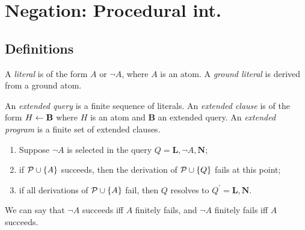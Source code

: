 \chapter{Negation: Procedural int.}

\section{Definitions}

\begin{dfn}[Literal]
    A \emph{literal} is of the form \(A\) or \(\neg A\), where \(A\) is an atom.
    A \emph{ground literal} is derived from a ground atom. 
\end{dfn}

\begin{dfn}
    An \emph{extended query} is a finite sequence of literals.
    An \emph{extended clause} is of the form \(H \leftarrow \mathbf{B}\) where \(H\) is an atom and \(\mathbf{B}\) an extended query.
    An \emph{extended program} is a finite set of extended clauses.
\end{dfn}

\begin{dfn}
    \begin{enumerate}
        \item Suppose \(\neg A\) is selected in the query \(Q = \mathbf{L}, \neg A, \mathbf{N}\);
        \item if \(\mathcal{P} \cup \lbrace A \rbrace\) succeeds, then the derivation of \(\mathcal{P} \cup \lbrace Q \rbrace\) fails at this point;
        \item if all derivations of \(\mathcal{P} \cup \lbrace A \rbrace\) fail, then \(Q\) resolves to \(Q^\prime = \mathbf{L},\mathbf{N}\).
    \end{enumerate}
    We can say that \(\neg A\) succeeds iff \(A\) finitely fails, and \(\neg A\) finitely fails iff \(A\) succeeds.
\end{dfn}

